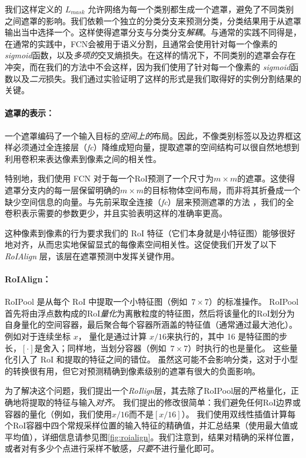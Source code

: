 我们这样定义的 $L_{mask}$ 允许网络为每一个类别都生成一个遮罩，避免了不同类别之间遮罩的影响。我们依赖一个独立的分类分支来预测分类，分类结果用于从遮罩输出当中选择一个。这样使得遮罩分支与分类分支\emph{解耦}。与通常的实践不同得是，在通常的实践中，FCN会被用于语义分割，且通常会使用针对每一个像素的\emph{sigmoid}函数，以及\emph{多项的}交叉熵损失。在这样的情况下，不同类别的遮罩会存在冲突，而在我们的方法中不会这样，因为我们使用了针对每一个像素的 \emph{sigmoid}函数以及\emph{二元}损失。我们通过实验证明了这样的形式是我们取得好的实例分割结果的关键。

\paragraph{遮罩的表示：} 一个遮罩编码了一个输入目标的\emph{空间上的}布局。因此，不像类别标签以及边界框这样必须通过全连接层（\emph{fc}）降维成短向量，提取遮罩的空间结构可以很自然地想到利用卷积来表达像素到像素之间的相关性。

特别地，我们使用 FCN  对于每一个RoI预测了一个尺寸为$m \times m$的遮罩。这使得遮罩分支内的每一层保留明确的$m \times m$的目标物体空间布局，而非将其折叠成一个缺少空间信息的向量。与先前采取全连接（\emph{fc}）层来预测遮罩的方法 ，我们的全卷积表示需要的参数更少，并且实验表明这样的准确率更高。

这种像素到像素的行为要求我们的 RoI 特征（它们本身就是小特征图）能够很好地对齐，从而忠实地保留显式的每像素空间相关性。这促使我们开发了以下 \emph{RoIAlign} 层，该层在遮罩预测中发挥关键作用。

\paragraph{RoIAlign：} RoIPool  是从每个 RoI 中提取一个小特征图（例如~$7\times7$）的标准操作。 RoIPool 首先将由浮点数构成的RoI\emph{量化}为离散粒度的特征图，然后将该量化的RoI划分为自身量化的空间容器，最后聚合每个容器所涵盖的特征值（通常通过最大池化）。例如对于连续坐标 $x$， 量化是通过计算 $x / 16$来执行的，其中 16 是特征图的步长，$[\cdot]$是舍入；同样地，当划分容器（例如~$7\times7$）时执行的也是量化。 这些量化引入了 RoI 和提取的特征之间的错位。 虽然这可能不会影响分类，这对于小型的转换很有用，但它对预测精确到像素级别的遮罩有很大的负面影响。

为了解决这个问题，我们提出一个\emph{RoIlign}层，其去除了RoIPool层的严格量化，正确地将提取的特征与输入\emph{对齐}。 我们提出的修改很简单：我们避免任何RoI边界或容器的量化（例如，我们使用$x/16$而不是$[x/16]$）。 我们使用双线性插值计算每个RoI容器中四个常规采样位置的输入特征的精确值，并汇总结果（使用最大值或平均值），详细信息请参见图\ref{fig:roialign}。我们注意到，结果对精确的采样位置，或者对有多少个点进行采样不敏感，\emph{只要}不进行量化即可。

